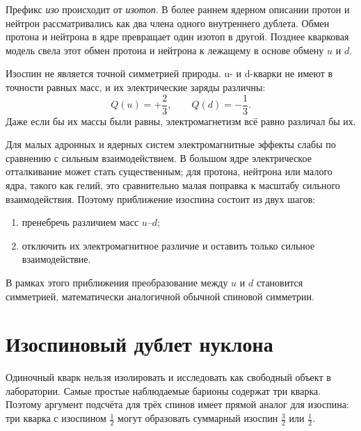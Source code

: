 Префикс \emph{изо} происходит от \emph{изотоп}. В более раннем ядерном описании протон и нейтрон рассматривались как два члена одного внутреннего дублета. Обмен протона и нейтрона в ядре превращает один изотоп в другой. Позднее кварковая модель свела этот обмен протона и нейтрона к лежащему в основе обмену \(u\) и \(d\).

\begin{classroomqa}
\end{classroomqa}

Изоспин не является точной симметрией природы. u- и d-кварки не имеют в точности равных масс, и их электрические заряды различны:
\begin{equation}
Q(u)=+\frac23,
\qquad
Q(d)=-\frac13.
\end{equation}
Даже если бы их массы были равны, электромагнетизм всё равно различал бы их.

Для малых адронных и ядерных систем электромагнитные эффекты слабы по сравнению с сильным взаимодействием. В большом ядре электрическое отталкивание может стать существенным; для протона, нейтрона или малого ядра, такого как гелий, это сравнительно малая поправка к масштабу сильного взаимодействия. Поэтому приближение изоспина состоит из двух шагов:

\begin{enumerate}
\item пренебречь различием масс \(u\)--\(d\);
\item отключить их электромагнитное различие и оставить только сильное взаимодействие.
\end{enumerate}

В рамках этого приближения преобразование между \(u\) и \(d\) становится симметрией, математически аналогичной обычной спиновой симметрии.

\section{Изоспиновый дублет нуклона}

Одиночный кварк нельзя изолировать и исследовать как свободный объект в лаборатории. Самые простые наблюдаемые барионы содержат три кварка. Поэтому аргумент подсчёта для трёх спинов имеет прямой аналог для изоспина: три кварка с изоспином \(\tfrac12\) могут образовать суммарный изоспин \(\tfrac32\) или \(\tfrac12\).

